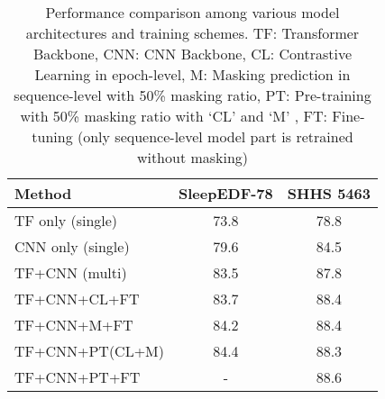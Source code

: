 \begin{table}[h]
\setlength{\tabcolsep}{10pt}
\caption{Performance comparison among various model architectures and training schemes. TF: Transformer Backbone, CNN: CNN Backbone, CL: Contrastive Learning in epoch-level, M: Masking prediction in sequence-level with 50\% masking ratio, PT: Pre-training with 50\% masking ratio with `CL' and `M' , FT: Fine-tuning (only sequence-level model part is retrained without masking)}
\label{table5}
\begin{tabular}{l|c|c}
\hline
\textbf{Method} & \textbf{SleepEDF-78} &  \textbf{SHHS 5463} \\
\hline
TF only (single) & 73.8 & 78.8  \\
\hline
CNN only (single) & 79.6 & 84.5  \\
\hline
TF+CNN (multi) & 83.5 & 87.8  \\
\hline
TF+CNN+CL+FT & 83.7 & 88.4  \\
\hline
TF+CNN+M+FT & 84.2 & 88.4  \\
\hline
TF+CNN+PT(CL+M) & 84.4 & 88.3 \\
\hline
TF+CNN+PT+FT & - & 88.6 \\
\hline
\end{tabular}
\end{table}